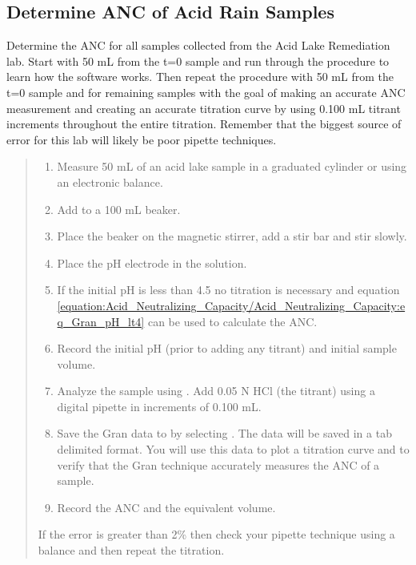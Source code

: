 \documentclass[letterpaper,10pt,english]{sphinxmanual}
\begin{document}
\subsection{Determine ANC of Acid Rain Samples}
\label{\detokenize{Acid_Neutralizing_Capacity/Acid_Neutralizing_Capacity:determine-anc-of-acid-rain-samples}}
Determine the ANC for all samples collected from the Acid Lake Remediation lab.  Start with 50 mL from the t=0 sample and run through the procedure to learn how the software works. Then repeat the procedure with 50 mL from the t=0 sample and for remaining samples with the goal of making an accurate ANC measurement and creating an accurate titration curve by using 0.100 mL titrant increments throughout the entire titration. Remember that the biggest source of error for this lab will likely be poor pipette techniques.
\begin{quote}
\begin{enumerate}
\item {} 
Measure 50 mL of an acid lake sample in a graduated cylinder or using an electronic balance.

\item {} 
Add to a 100 mL beaker.

\item {} 
Place the beaker on the magnetic stirrer, add a stir bar and stir slowly.

\item {} 
Place the pH electrode in the solution.

\item {} 
If the initial pH is less than 4.5 no titration is necessary and equation \eqref{equation:Acid_Neutralizing_Capacity/Acid_Neutralizing_Capacity:eq_Gran_pH_lt4} can be used to calculate the ANC.

\item {} 
Record the initial pH (prior to adding any titrant) and initial sample volume.

\item {} 
Analyze the sample using {\hyperref[\detokenize{ProCoDA/ProCoDA:heading-procoda-gran-plot}]{}}.  Add 0.05 N HCl (the titrant) using a digital pipette in increments of 0.100 mL.

\item {} 
Save the Gran data to  by selecting . The data will be saved in a tab delimited format. You will use this data to plot a titration curve and to verify that the Gran technique accurately measures the ANC of a sample.

\item {} 
Record the ANC and the equivalent volume.

\end{enumerate}

If the error is greater than 2\% then check your pipette technique using a balance and then repeat the titration.
\end{quote}
\end{document}
